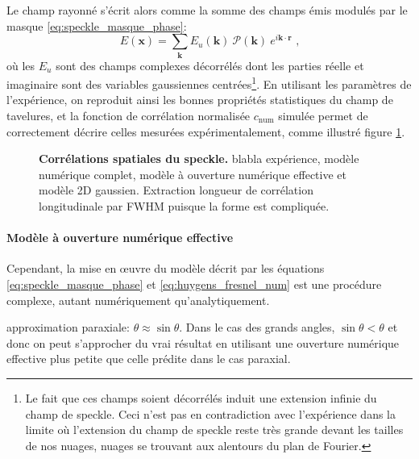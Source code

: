 Le champ rayonné s'écrit alors comme la somme des champs émis modulés par le masque \ref{eq:speckle_masque_phase}:
\begin{equation}
E(\mathbf{x})=\sum_{\mathbf{k}} E_u(\mathbf{k}) \: \mathcal{P}(\mathbf{k}) \: e^{i \mathbf{k} \cdot \mathbf{r}} \text{ ,}
\label{eq:huygens_fresnel_num}
\end{equation}
où les $E_u$ sont des champs complexes décorrélés dont les parties réelle et imaginaire sont des variables gaussiennes centrées\footnote{Le fait que ces champs soient décorrélés induit une extension infinie du champ de speckle. Ceci n'est pas en contradiction avec l'expérience dans la limite où l'extension du champ de speckle reste très grande devant les tailles de nos nuages, nuages se trouvant aux alentours du plan de Fourier.}. En utilisant les paramètres de l'expérience, on reproduit ainsi les bonnes propriétés statistiques du champ de tavelures, et la fonction de corrélation normalisée $c_{\mathrm{num}}$ simulée
permet de correctement décrire celles mesurées expérimentalement, comme illustré figure \ref{fig:speckle_correlations_exp}.





\begin{figure}
\centering

\caption{\textbf{Corrélations spatiales du speckle.} blabla expérience, modèle numérique complet, modèle à ouverture numérique effective et modèle 2D gaussien. Extraction longueur de corrélation longitudinale par FWHM puisque la forme est compliquée.}
\label{fig:speckle_correlations_exp}
\end{figure}





\paragraph*{Modèle à ouverture numérique effective}
Cependant, la mise en œuvre du modèle décrit par les équations \ref{eq:speckle_masque_phase} et \ref{eq:huygens_fresnel_num} est une procédure complexe, autant numériquement qu'analytiquement. 

approximation paraxiale: $\theta \approx \sin{\theta}$. Dans le cas des grands angles, $\sin{\theta}<\theta$ et donc on peut s'approcher du vrai résultat en utilisant une ouverture numérique effective plus petite que celle prédite dans le cas paraxial.






